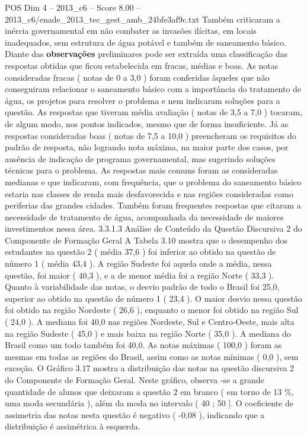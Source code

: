 \begin{textsample}{POS Dim 4 – 2013\_c6 – Score 8.00 – 2013\_c6/enade\_2013\_tec\_gest\_amb\_24bfe3af9c.txt}
Também criticaram a inércia governamental em não combater as invasões ilícitas, em locais inadequados, sem estrutura de água potável e também de saneamento básico.
Diante das \textbf{observações} preliminares pode ser extraída uma classificação das respostas obtidas que ficou estabelecida em fracas, médias e boas.
As notas consideradas fracas ( notas de 0 a 3,0 ) foram conferidas àqueles que não conseguiram relacionar o saneamento básico com a importância do tratamento de água, os projetos para resolver o problema e nem indicaram soluções para a questão.
As respostas que tiveram média avaliação ( notas de 3,5 a 7,0 ) tocaram, de algum modo, nos pontos indicados, mesmo que de forma insuficiente.
Já as respostas consideradas boas ( notas de 7,5 a 10,0 ) preencheram os requisitos do padrão de resposta, não logrando nota máxima, na maior parte dos casos, por ausência de indicação de programa governamental, mas sugerindo soluções técnicas para o problema.
As respostas mais comuns foram as consideradas medianas e que indicaram, com frequência, que o problema do saneamento básico estaria nas classes de renda mais desfavorecida e nas regiões consideradas como periferias das grandes cidades.
Também foram frequentes respostas que citaram a necessidade de tratamento de água, acompanhada da necessidade de maiores investimentos nessa área. 3.3.1.3 Análise de Conteúdo da Questão Discursiva 2 do Componente de Formação Geral A Tabela 3.10 mostra que o desempenho dos estudantes na questão 2 ( média 37,6 ) foi inferior ao obtido na questão de número 1 ( média 43,4 ).
A região Sudeste foi aquela onde a média, nessa questão, foi maior ( 40,3 ), e a de menor média foi a região Norte ( 33,3 ).
Quanto à variabilidade das notas, o desvio padrão de todo o Brasil foi 25,0, superior ao obtido na questão de número 1 ( 23,4 ).
O maior desvio nessa questão foi obtido na região Nordeste ( 26,6 ), enquanto o menor foi obtido na região Sul ( 24,0 ).
A mediana foi 40,0 nas regiões Nordeste, Sul e Centro-Oeste, mais alta na região Sudeste ( 45,0 ) e mais baixa na região Norte ( 35,0 ).
A mediana do Brasil como um todo também foi 40,0.
As notas máximas ( 100,0 ) foram as mesmas em todas as regiões do Brasil, assim como as notas mínimas ( 0,0 ), sem exceção.
O Gráfico 3.17 mostra a distribuição das notas na questão discursiva 2 do Componente de Formação Geral.
Neste gráfico, observa -se a grande quantidade de alunos que deixaram a questão 2 em branco ( em torno de 13 \%, uma moda secundária ), além da moda no intervalo ( 40 ; 50 ].
O coeficiente de assimetria das notas nesta questão é negativo ( -0,08 ), indicando que a distribuição é assimétrica à esquerda.

\end{textsample}
